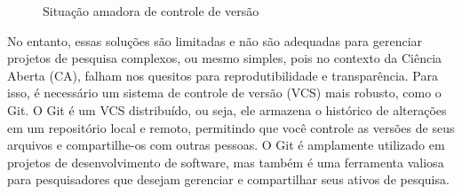 \documentclass[
  a4paper,
]{article}
\begin{document}
\begin{figure}


\caption{\label{fig-funny-git}Situação amadora de controle de versão}

\end{figure}%

No entanto, essas soluções são limitadas e não são adequadas para
gerenciar projetos de pesquisa complexos, ou mesmo simples, pois no
contexto da Ciência Aberta (CA), falham nos quesitos para
reprodutibilidade e transparência. Para isso, é necessário um sistema de
controle de versão (VCS) mais robusto, como o Git. O Git é um VCS
distribuído, ou seja, ele armazena o histórico de alterações em um
repositório local e remoto, permitindo que você controle as versões de
seus arquivos e compartilhe-os com outras pessoas. O Git é amplamente
utilizado em projetos de desenvolvimento de software, mas também é uma
ferramenta valiosa para pesquisadores que desejam gerenciar e
compartilhar seus ativos de pesquisa.
\end{document}
